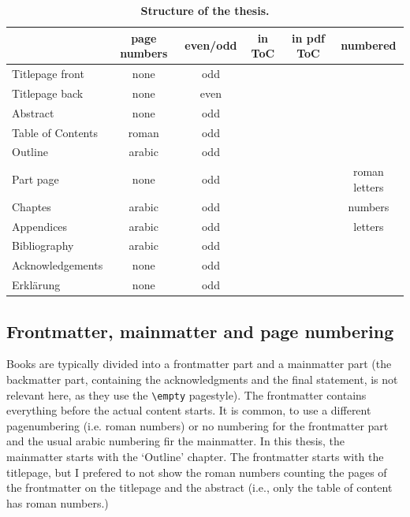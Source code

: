 \begin{table}
	\centering 
	\caption{\textbf{Structure of the thesis.}}
	\label{tab:thesistructure}
	\vspace{5ex}
	\begin{tabular}{lccccc} 
		\toprule
		 & page numbers & even/odd & in ToC & in pdf ToC & numbered  \\ 
		\midrule 
		Titlepage front  & none & odd & \color{bqred}\XSolidBrush& \color{bqgreen} \CheckmarkBold &\color{bqred} \XSolidBrush\\
		Titlepage back & none & even & \color{bqred}\XSolidBrush& \color{bqred}\XSolidBrush& \color{bqred}\XSolidBrush\\
		Abstract & none & odd & \color{bqred}\XSolidBrush& \color{bqgreen}\CheckmarkBold & \color{bqred}\XSolidBrush\\
		Table of Contents & roman & odd & \color{bqred}\XSolidBrush& \color{bqgreen}\CheckmarkBold &\color{bqred} \XSolidBrush\\
		Outline & arabic & odd &\color{bqgreen} \CheckmarkBold &\color{bqgreen} \CheckmarkBold & \color{bqred}\XSolidBrush\\
		Part page & none & odd & \color{bqgreen}\CheckmarkBold & \color{bqgreen}\CheckmarkBold & roman letters\\
		Chaptes & arabic & odd & \color{bqgreen}\CheckmarkBold &\color{bqgreen} \CheckmarkBold & numbers\\
		Appendices & arabic & odd & \color{bqgreen}\CheckmarkBold &\color{bqgreen} \CheckmarkBold & letters\\
		Bibliography & arabic & odd & \color{bqgreen}\CheckmarkBold & \color{bqgreen}\CheckmarkBold & \color{bqred}\XSolidBrush\\
		Acknowledgements & none & odd & \color{bqred}\XSolidBrush& \color{bqgreen}\CheckmarkBold & \color{bqred}\XSolidBrush\\
		Erklärung & none & odd & \color{bqred}\XSolidBrush&\color{bqgreen} \CheckmarkBold & \color{bqred}\XSolidBrush\\
		\bottomrule
	\end{tabular}
\end{table}


\subsection{Frontmatter, mainmatter and page numbering}
Books are typically divided into a frontmatter part and a mainmatter part (the backmatter part, containing the acknowledgments and the final statement, is not relevant here, as they use the \verb|\empty| pagestyle).
The frontmatter contains everything before the actual content starts. It is common, to use a different pagenumbering (i.e. roman numbers) or no numbering for the frontmatter part and the usual arabic numbering fir the mainmatter. In this thesis, the mainmatter starts with the `Outline' chapter. 
The frontmatter starts with the titlepage, but I prefered to not show the roman numbers counting the pages of the frontmatter on the titlepage and the abstract (i.e., only the table of content has roman numbers.)


